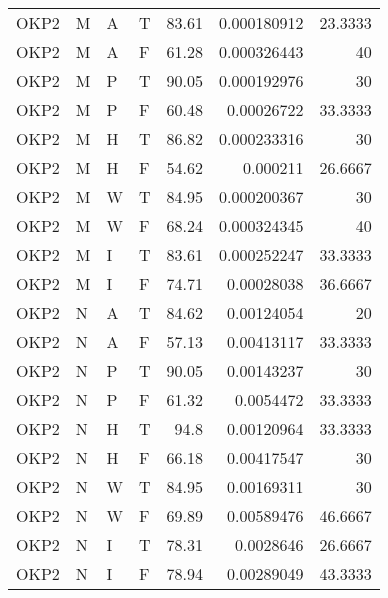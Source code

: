 \begin{tabular}{llllrrr}
    OKP2     & M     & A     & T          & 83.61      & 0.000180912 & 23.3333  \\
    OKP2     & M     & A     & F          & 61.28      & 0.000326443 & 40       \\
    OKP2     & M     & P     & T          & 90.05      & 0.000192976 & 30       \\
    OKP2     & M     & P     & F          & 60.48      & 0.00026722  & 33.3333  \\
    OKP2     & M     & H     & T          & 86.82      & 0.000233316 & 30       \\
    OKP2     & M     & H     & F          & 54.62      & 0.000211    & 26.6667  \\
    OKP2     & M     & W     & T          & 84.95      & 0.000200367 & 30       \\
    OKP2     & M     & W     & F          & 68.24      & 0.000324345 & 40       \\
    OKP2     & M     & I     & T          & 83.61      & 0.000252247 & 33.3333  \\
    OKP2     & M     & I     & F          & 74.71      & 0.00028038  & 36.6667  \\
    OKP2     & N     & A     & T          & 84.62      & 0.00124054  & 20       \\
    OKP2     & N     & A     & F          & 57.13      & 0.00413117  & 33.3333  \\
    OKP2     & N     & P     & T          & 90.05      & 0.00143237  & 30       \\
    OKP2     & N     & P     & F          & 61.32      & 0.0054472   & 33.3333  \\
    OKP2     & N     & H     & T          & 94.8       & 0.00120964  & 33.3333  \\
    OKP2     & N     & H     & F          & 66.18      & 0.00417547  & 30       \\
    OKP2     & N     & W     & T          & 84.95      & 0.00169311  & 30       \\
    OKP2     & N     & W     & F          & 69.89      & 0.00589476  & 46.6667  \\
    OKP2     & N     & I     & T          & 78.31      & 0.0028646   & 26.6667  \\
    OKP2     & N     & I     & F          & 78.94      & 0.00289049  & 43.3333  \\
    \hline
\end{tabular}